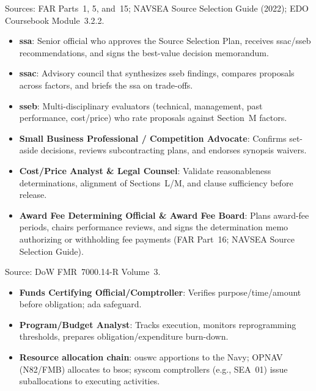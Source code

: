 \documentclass[../main.tex]{subfiles}
\begin{document}
\begin{description}[style=nextline, labelsep=0.5em, font=\bfseries]
	\item[\textbf{Source selection governance.}]
	Sources: FAR Parts~1, 5, and~15; NAVSEA Source Selection Guide (2022); EDO Coursebook Module~3.2.2.
      \begin{itemize}
        \item \textbf{\ac{ssa}}: Senior official who approves the Source Selection Plan, receives \ac{ssac}/\ac{sseb} recommendations, and signs the best-value decision memorandum.
        \item \textbf{\ac{ssac}}: Advisory council that synthesizes \ac{sseb} findings, compares proposals across factors, and briefs the \ac{ssa} on trade-offs.
        \item \textbf{\ac{sseb}}: Multi-disciplinary evaluators (technical, management, past performance, cost/price) who rate proposals against Section~M factors.
        \item \textbf{Small Business Professional / Competition Advocate}: Confirms set-aside decisions, reviews subcontracting plans, and endorses synopsis waivers.
        \item \textbf{Cost/Price Analyst \& Legal Counsel}: Validate reasonableness determinations, alignment of Sections~L/M, and clause sufficiency before release.
        \item \textbf{Award Fee Determining Official \& Award Fee Board}: Plans award-fee periods, chairs performance reviews, and signs the determination memo authorizing or withholding fee payments (FAR Part~16; NAVSEA Source Selection Guide).
      \end{itemize}

	\item[\textbf{Fiscal control \& certification.}]
	Source: DoW FMR~7000.14-R Volume~3.
      \begin{itemize}
        \item \textbf{Funds Certifying Official/Comptroller}: Verifies purpose/time/amount before obligation; \ac{ada} safeguard.
        \item \textbf{Program/Budget Analyst}: Tracks execution, monitors reprogramming thresholds, prepares obligation/expenditure burn-down.
        \item \textbf{Resource allocation chain}: \ac{ouswc} apportions to the Navy; OPNAV (N82/FMB) allocates to \acp{bso}; \ac{syscom} comptrollers (e.g., SEA~01) issue suballocations to executing activities.
      \end{itemize}


\end{description}
\end{document}
